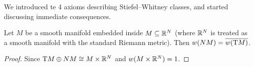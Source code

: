 
\lecture{}

\begin{recall}
We introduced te 4 axioms describing Stiefel--Whitney classes, and
started discussing immediate consequences.
\end{recall}

\begin{lemma}
Let $M$ be a smooth manifold embedded inside $M\subseteq\mathbb{R}^{N}$ (where
$\mathbb{R}^{N}$ is treated as a smooth manifold with the standard Riemann
metric). Then $w(NM)=\overline{w(\mathrm{T} M)}$.
\end{lemma}

\begin{proof}
Since $\mathrm{T} M\oplus NM\cong M\times\mathbb{R}^{N}$ and $w(M\times\mathbb{R}^{N})=1$.
\end{proof}

